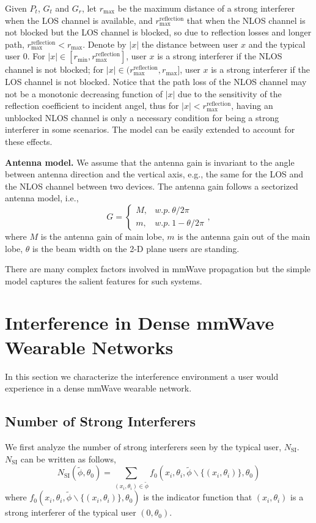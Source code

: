 \documentclass[10pt, conference, letterpaper]{IEEEtran}
\begin{document}
Given $P_t$, $G_t$ and $G_r$, let $r_{\max}$ be the maximum distance of a strong interferer when the LOS channel is available, and $r_{\max}^{\mathrm{reflection}}$ that when the NLOS channel is not blocked but the LOS channel is blocked, so due to reflection losses and longer path, $r_{\max}^{\mathrm{reflection}}<r_{\max}$.
Denote by $|x|$ the distance between user $x$ and the typical user $0$. 
For $|x|\in[r_{\min},r_{\max}^{\mathrm{reflection}}]$, user $x$ is a strong interferer if the NLOS channel is not blocked; for $|x|\in(r_{\max}^{\mathrm{reflection}}, r_{\max}]$, user $x$ is a strong interferer if the LOS channel is not blocked.
Notice that the path loss of the NLOS channel may not be a monotonic decreasing function of $|x|$ due to the sensitivity of the reflection coefficient to incident angel, thus for $|x|<r_{\max}^{\mathrm{reflection}}$, having an unblocked NLOS channel is only a necessary condition for being a strong interferer in some scenarios. 
The model can be easily extended to account for these effects. 


\textbf{Antenna model.} We assume that the antenna gain is invariant to the angle between antenna direction and the vertical axis, e.g., the same for the LOS and the NLOS channel between two devices. 
The antenna gain follows a sectorized antenna model, i.e., 
\begin{equation*}
G = 
\begin{cases}
M, & w.p. ~ \theta/2\pi \\
m, & w.p. ~ 1-\theta/2\pi
\end{cases},
\end{equation*}
where $M$ is the antenna gain of main lobe, $m$ is the antenna gain out of the main lobe, $\theta$ is the beam width on the 2-D plane users are standing.

There are many complex factors involved in mmWave propagation but the simple model captures the salient features for such systems.


\section{Interference in Dense mmWave Wearable Networks}\label{section:interference}
In this section we characterize the interference environment a user would experience in a dense mmWave wearable network.


\subsection{Number of Strong Interferers}\label{section:channel:number}
We first analyze the number of strong interferers seen by the typical user, $N_{\mathrm{SI}}$. 
$N_{\mathrm{SI}}$ can be written as follows, 
\begin{equation}
N_{\mathrm{SI}}(\tilde{\phi}, \theta_0) = \sum_{(x_i, \theta_i)\in \tilde{\phi}}f_0(x_i, \theta_i, \tilde{\phi}\backslash\{(x_i,\theta_i)\}, \theta_0)
\end{equation}
where $f_0(x_i, \theta_i, \tilde{\phi}\backslash\{(x_i,\theta_i)\}, \theta_0)$ is the indicator function that $(x_i, \theta_i)$ is a strong interferer of the typical user $(0,\theta_0)$.
\end{document}

